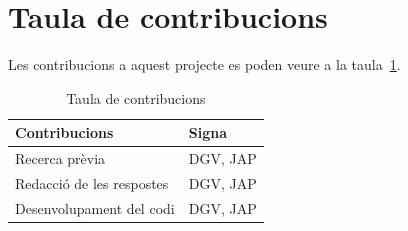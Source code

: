 \documentclass{article}
\begin{document}
\section{Taula de contribucions}
Les contribucions a aquest projecte es poden veure a la
taula~\ref{table:contribucions}.
\begin{table}[h]
	\centering
    \begin{tabular}{|l|l|}
		\hline
        Contribucions & Signa \\\hline\hline
        Recerca prèvia & DGV, JAP \\\hline
        Redacció de les respostes & DGV, JAP \\\hline
        Desenvolupament del codi & DGV, JAP \\\hline
    \end{tabular}
    \caption{Taula de contribucions}
    \label{table:contribucions}
\end{table}
\end{document}
